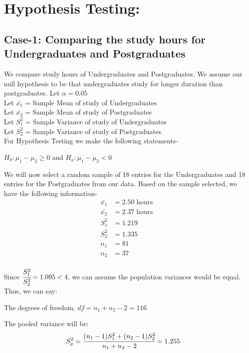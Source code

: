 \documentclass[12pt,onecolumn,letterpaper]{article}
\begin{document}
\section {Hypothesis Testing:}
\subsection{Case-1: Comparing the study hours for Undergraduates and Postgraduates}
We compare study hours of Undergraduates and Postgraduates. We assume our null hypothesis to be that undergraduates study for longer duration than postgraduates. Let $\alpha = 0.05$\\

Let $\bar{x_1}$ = Sample Mean of study of Undergraduates \\
Let $\bar{x_2}$ = Sample Mean of study of Postgraduates \\
Let $S_1^2$ = Sample Variance of study of Undergraduates \\
Let $S_2^2$ = Sample Variance of study of Postgraduates \\ 

For Hypothesis Testing we make the following statements-
\begin{center}
    $ H_0 : \mu_1 - \mu_2 \geq 0$ and $H_a : \mu_1 - \mu_2 < 0$  \\
\end{center}

 We will now select a random sample of 18 entries  for the Undergraduates and 18 entries for the Postgraduates from our data. Based on the sample selected, we have the following information-
\begin{align}
    \bar{x_1} &= 2.50 \text{ hours}\\ 
    \bar{x_2} &= 2.37 \text{ hours} \\ 
    S_1^2 &= 1.219\\
    S_2^2 &= 1.335\\
    n_1 &= 81 \\
    n_2 &= 37\\
\end{align}
    
Since $\cfrac{S_1^2}{S_2^2} = 1.095 < 4$, we can assume the population variances would be equal. Thus, we can say: \par 
The degrees of freedom, $df = n_1 + n_2 -2 = 116$

 The pooled variance will be:
 \begin{align}
     S_p^2 &= \cfrac{(n_1-1)S_1^2 + (n_2-1)S_2^2}{n_1+n_2-2} = 1.255
 \end{align}
      
\end{document}
